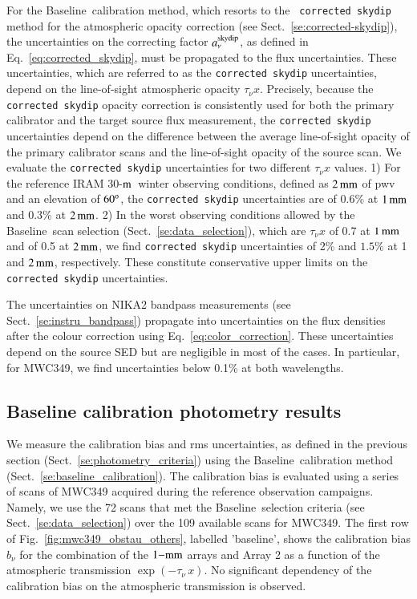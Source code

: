 \documentclass[traditionalabstract]{aa}
\newcommand{\trentemetre}{30-$\rm{m}$}
\newcommand{\baseline}{Baseline}%
\newcommand{\taunu}{\tau_{\nu}}
\begin{document}
{{For the \baseline\ calibration method, which resorts to the {\tt
corrected skydip} method for the atmospheric opacity correction (see
Sect.~\ref{se:corrected-skydip}), the uncertainties on the
correcting factor $a_\nu^{\rm{skydip}}$, as defined in
Eq.~\ref{eq:corrected_skydip}, must be propagated to the flux
uncertainties. These uncertainties, which are referred to as the
{\tt corrected skydip} uncertainties, depend on the line-of-sight atmospheric
opacity $\taunu x$. Precisely, because the {\tt corrected skydip}
opacity correction is consistently used for both the primary
calibrator and the target source flux measurement, the {\tt corrected skydip}
uncertainties depend on the difference between the average
line-of-sight opacity of the primary calibrator scans and the
line-of-sight opacity of the source scan.   
We evaluate the {\tt corrected skydip} uncertainties for two
different $\taunu x$ values. 1) For the reference IRAM \trentemetre\
winter observing conditions, defined as $2\,\rm{mm}$ of pwv and an
elevation of $60^{\rm{o}}$, the {\tt corrected skydip} uncertainties are of
0.6\% at $1\,\rm{mm}$ and 0.3\% at $2\,\rm{mm}$. 2) In the worst
observing conditions allowed by the \baseline\ scan selection
(Sect.~\ref{se:data_selection}),
which are $\taunu x$ of 0.7 at $1\,\rm{mm}$ and of 0.5 at
$2\,\rm{mm}$, we find {\tt corrected skydip} uncertainties of 2\% and
$1.5\%$ at 1 and $2\,\rm{mm}$, respectively. These constitute
conservative upper limits on the {\tt corrected skydip}
uncertainties.

The uncertainties on NIKA2 bandpass measurements (see
Sect.~\ref{se:instru_bandpass}) propagate into
uncertainties on the flux densities after the colour correction using
Eq.~\ref{eq:color_correction}. These
uncertainties depend on the source SED but are negligible in most of
the cases. In particular, for MWC349, we find uncertainties below 0.1\% at
both wavelengths.}


\subsection{Baseline calibration photometry results}
\label{se:photometry_baseline}

We measure the calibration bias and rms uncertainties, as defined
in the previous section (Sect.~\ref{se:photometry_criteria}) using the
\baseline\ calibration method (Sect.~\ref{se:baseline_calibration}).
The calibration bias is evaluated using a
series of scans of MWC349 acquired during the
 reference observation campaigns. Namely, we use the 72 scans that met
 the \baseline\ selection
 criteria (see Sect.~\ref{se:data_selection}) over the 109 available
scans for MWC349. The first row of
Fig.~\ref{fig:mwc349_obstau_others}, labelled 'baseline', shows the
calibration bias $b_{\nu}$ for the combination of the $1\rm{-mm}$ arrays and
Array 2 as a function of the atmospheric transmission 
$\exp \left( - \taunu \, x \right)$. No significant dependency of the
calibration bias on the atmospheric transmission is observed. 

}
\end{document}
